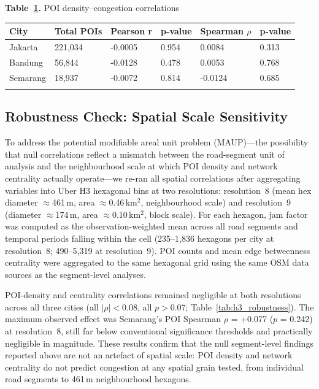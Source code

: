 \documentclass[12pt,a4paper]{article}
\begin{document}
\textbf{Table~\ref{tab:table11}.} POI density--congestion correlations

\begin{longtable}[]{@{}llllll@{}}
\toprule\noalign{}
City & Total POIs & Pearson r & p-value & Spearman $\rho$ & p-value \\
\midrule\noalign{}
\endhead
\bottomrule\noalign{}
\endlastfoot
Jakarta & 221,034 & -0.0005 & 0.954 & 0.0084 & 0.313 \\
Bandung & 56,844 & -0.0128 & 0.478 & 0.0053 & 0.768 \\
Semarang & 18,937 & -0.0072 & 0.814 & -0.0124 & 0.685 \\
\label{tab:table11}
\end{longtable}

\subsection{Robustness Check: Spatial Scale Sensitivity}
\label{sec:h3_robustness}

To address the potential modifiable areal unit problem (MAUP)---the possibility that null correlations reflect a mismatch between the road-segment unit of analysis and the neighbourhood scale at which POI density and network centrality actually operate---we re-ran all spatial correlations after aggregating variables into Uber H3 hexagonal bins at two resolutions: resolution~8 (mean hex diameter $\approx$461\,m, area $\approx$0.46\,km$^2$, neighbourhood scale) and resolution~9 (diameter $\approx$174\,m, area $\approx$0.10\,km$^2$, block scale). For each hexagon, jam factor was computed as the observation-weighted mean across all road segments and temporal periods falling within the cell (235--1,836 hexagons per city at resolution~8; 490--5,319 at resolution~9). POI counts and mean edge betweenness centrality were aggregated to the same hexagonal grid using the same OSM data sources as the segment-level analyses.

POI-density and centrality correlations remained negligible at both resolutions across all three cities (all $|\rho| < 0.08$, all $p > 0.07$; Table~\ref{tab:h3_robustness}). The maximum observed effect was Semarang's POI Spearman $\rho$ = +0.077 ($p$ = 0.242) at resolution~8, still far below conventional significance thresholds and practically negligible in magnitude. These results confirm that the null segment-level findings reported above are not an artefact of spatial scale: POI density and network centrality do not predict congestion at any spatial grain tested, from individual road segments to 461\,m neighbourhood hexagons.
\end{document}
